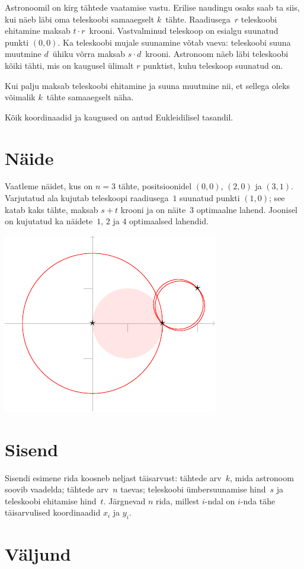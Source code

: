 
\noindent
Astronoomil on kirg tähtede vaatamise vastu.
Erilise naudingu osaks saab ta siis, kui näeb läbi oma teleskoobi samaaegselt $k$~tähte.
Raadiusega~$r$ teleskoobi ehitamine maksab $t\cdot r$~krooni.
Vastvalminud teleskoop on esialgu suunatud punkti $(0,0)$.
Ka teleskoobi mujale suunamine võtab vaeva:
teleskoobi suuna muutmine $d$~ühiku võrra maksab $s\cdot d$~krooni.
Astronoom näeb läbi teleskoobi kõiki tähti, mis on kaugusel ülimalt $r$ punktist, kuhu
teleskoop suunatud on.

Kui palju maksab teleskoobi ehitamine ja suuna muutmine nii, et sellega oleks võimalik
$k$~tähte samaaegselt näha.

\medskip

Kõik koordinaadid ja kaugused on antud Eukleidilisel tasandil.


\section*{Näide}

Vaatleme näidet, kus on $n=3$ tähte, positsioonidel $(0,0)$, $(2,0)$ ja $(3,1)$.
Varjutatud ala kujutab teleskoopi raadiusega~$1$ suunatud punkti $(1,0)$; see katab
kaks tähte, maksab $s + t$ krooni ja on näite~$3$ optimaalne lahend.
Joonisel on kujutatud ka näidete~$1$, $2$ ja $4$ optimaalsed lahendid.

\medskip
\noindent
\includegraphics[width=.3\textwidth]{img/samples.pdf}


\section*{Sisend}

Sisendi esimene rida koosneb neljast täisarvust:
tähtede arv~$k$, mida astronoom soovib vaadelda;
tähtede arv~$n$ taevas;
teleskoobi ümbersuunamise hind~$s$ ja
teleskoobi ehitamise hind~$t$.
Järgnevad $n$ rida, millest $i$-ndal on $i$-nda tähe
täisarvulised koordinaadid $x_i$ ja $y_i$.

\section*{Väljund}

